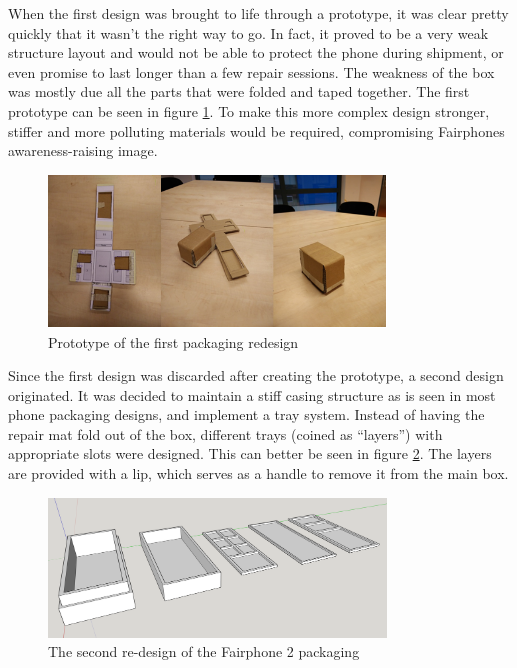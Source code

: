 \documentclass[final,a4paper]{report} %
\begin{document}
	When the first design was brought to life through a prototype, it was clear pretty quickly that it wasn't the right way to go. In fact, it proved to be a very weak structure layout and would not be able to protect the phone during shipment, or even promise to last longer than a few repair sessions. The weakness of the box was mostly due all the parts that were folded and taped together. The first prototype can be seen in figure \ref{fig:Prototype of box design 1}. To make this more complex design stronger, stiffer and more polluting materials would be required, compromising Fairphones awareness-raising image.
	
	\begin{figure}[H]
		\centering
		\includegraphics[width=0.8\textwidth]{resources/BoxPrototype1}
		\caption{Prototype of the first packaging redesign}
		\label{fig:Prototype of box design 1}
	\end{figure}
	
	Since the first design was discarded after creating the prototype, a second design originated. It was decided to maintain a stiff casing structure as is seen in most phone packaging designs, and implement a tray system. Instead of having the repair mat fold out of the box, different trays (coined as ``layers'') with appropriate slots were designed. This can better be seen in figure \ref{fig:Box design 2}. The layers are provided with a lip, which serves as a handle to remove it from the main box.
	
	\begin{figure}[H]
		\centering
		\includegraphics[width=0.8\textwidth]{resources/BoxDesign2}
		\caption{The second re-design of the Fairphone 2 packaging}
		\label{fig:Box design 2}
	\end{figure}
	
\end{document}
